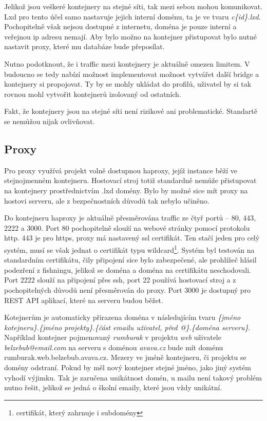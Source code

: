 \documentclass[a4paper,oneside,12pt]{report}
\begin{document}
Jelikož jsou veškeré kontejnery na stejné síti, tak mezi sebou mohou komunikovat.
Lxd pro tento účel samo nastavuje jejich interní doménu, ta je ve tvaru \textit{c\{id\}.lxd}.
Pochopitelně však nejsou dostupné z internetu, doména je pouze interní a veřejnou ip adresu nemají.
Aby bylo možno na kontejner přistupovat bylo nutné nastavit proxy, které mu databáze bude přeposílat.

Nutno podotknout, že i traffic mezi kontejnery je aktuálně omezen limitem.
V budoucno se tedy nabízí možnost implementovat možnost vytvářet další bridge a kontejnery si propojovat.
Ty by se mohly ukládat do profilů, uživatel by si tak rovnou mohl vytvořit kontejnerů izolovaný od ostatních.

Fakt, že kontejnery jsou na stejné síti není rizikové ani problematické.
Standartě se nemůžou nijak ovlivňovat.

\subsection{Proxy}

Pro proxy využívá projekt volně dostupnou haproxy, jejíž instance běží ve stejnojmenném kontejneru.
Hostovací stroj totiž standardně nemůže přistupovat na kontejnery prostřednictvím .lxd domény.
Bylo by možné sice mít proxy na hostovi serveru, ale z bezpečnostních důvodů tak nebylo učiněno.

Do kontejneru haproxy je aktuálně přesměrována traffic ze čtyř portů -- 80, 443, 2222 a 3000.
Port 80 pochopitelně slouží na webové stránky pomocí protokolu http.
443 je pro https, proxy má nastavený ssl certifikát.
Ten stačí jeden pro celý systém, musí se však jednat o certifikát typu wildcard\footnote{certifikát, který zahrnuje i subdomény}.
Systém byl testován na standardním certifikátu, čily připojení sice bylo zabezpečené, ale prohlížeč hlásil podezření z fishningu, jelikož se doména a doména na certifikátu neschodovali.
Port 2222 slouží na připojení přes ssh, port 22 používá hostovací stroj a z pochopitelných důvodů není přesměrován do proxy.
Port 3000 je dostupný pro REST API aplikací, které na serveru budou běžet.

Kotejnerům je automaticky přirazena doména v následujícím tvaru \textit{\{jméno kotejneru\}.\{jméno projekty\}.\{část emailu uživatel, před @\}.\{doména serveru\}}.
Například kontejner pojmenovaný \textit{rumburak} v projektu \textit{web} uživatele \textit{belzebub@email.com} na serveru s doménou \textit{avava.cz} bude mít doménu {rumburak.web.belzebub.avava.cz}.
Mezery ve jméně kontejneru, či projektu se domény odstraní.
Pokud by měl nový kontejner stejné jméno, jako jiný systém vyhodí výjimku.
Tak je zaručena unikátnost domén, u mailu není takový problém nutno řešit, jelikož se jedná o školní emaily, které jsou vždy unikátní.
\end{document}
